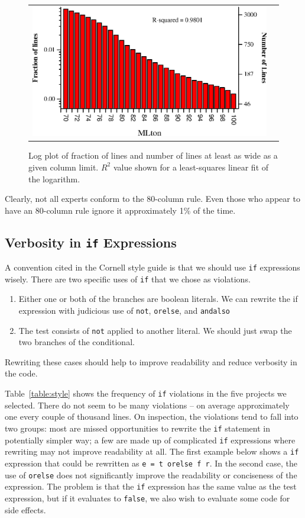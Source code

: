 \documentclass[12pt,abstracton]{scrartcl}
\begin{document}
\begin{figure}[h!]
\begin{tabular}{cc}
\includegraphics[scale=0.68]{log-mlton.eps} &
\end{tabular}
\caption{Log plot of fraction of lines and number of lines at least as wide as a given column limit. $R^{2}$ value shown for a least-squares linear fit of the logarithm.}
\label{fig:log-width}
\end{figure}

Clearly, not all experts conform to the 80-column rule.
Even those who appear to have an 80-column rule ignore it approximately 1\% of the time.
\subsection{Verbosity in \texttt{if} Expressions}
A convention cited in the Cornell style guide is that we should use \texttt{if}
expressions wisely. There are two specific uses of \texttt{if} that we
chose as violations.
\begin{enumerate}
\item Either one or both of the branches are boolean literals. We can rewrite the if expression with judicious use of \texttt{not}, \texttt{orelse}, and \texttt{andalso}
\item The test consists of \texttt{not} applied to another literal. We should just swap the two branches of the conditional.
\end{enumerate}
Rewriting these cases should help to improve readability and reduce verbosity in the code.

Table~\ref{table:style} shows the frequency of \texttt{if} violations in the five projects we selected.
There do not seem to be many violations -- on average approximately one every couple of thousand lines.
On inspection, the violations tend to fall into two groups: most are
missed opportunities to rewrite the \texttt{if} statement in potentially simpler way;
a few are made up of complicated \texttt{if} expressions where rewriting may not improve readability at all.
The first example below shows a \texttt{if} expression that could be rewritten as \texttt{e = t orelse f r}.
In the second case, the use of \texttt{orelse} does not significantly improve the readability or conciseness
of the expression. The problem is that the \texttt{if} expression has the same value as the test expression,
but if it evaluates to \texttt{false}, we also wish to evaluate some code for side effects.
\end{document}
